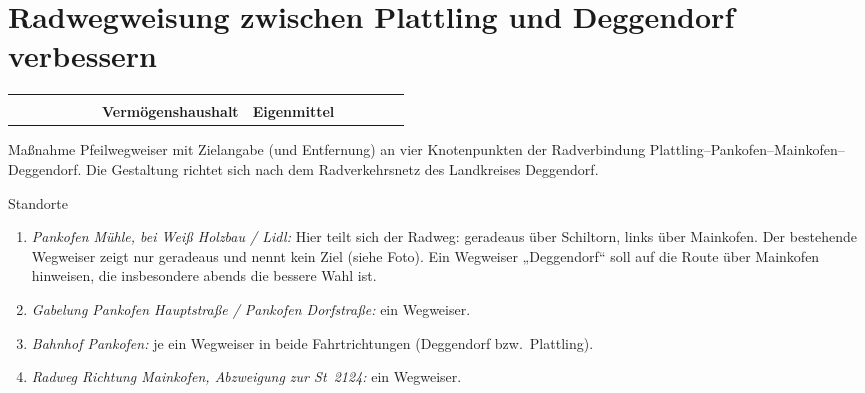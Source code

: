 \documentclass[11pt, a4paper]{article}
\makeatletter
\newcommand{\rubrik}[1]{{\small\bfseries\color{GruenAccent}\textls[80]{\MakeUppercase{#1}}}}
\newcommand{\kennzahl}[1]{\leavevmode{\scriptsize\color{Grau}\textls[60]{\MakeUppercase{#1}}}}
\newcommand{\massnahme}[3]{%
  \rubrik{#1}\par\nobreak\vspace{1mm}%
  \section{#2}\label{#3}}
\newcommand{\eckdaten}[3]{%
  \begin{tcolorbox}[enhanced, colback=GruenLight, frame hidden, arc=1.5mm,
      left=5mm, right=5mm, top=2.5mm, bottom=2.5mm, before skip=0pt, after skip=5mm]
    \begin{tabularx}{\linewidth}{@{}p{0.22\linewidth} p{0.24\linewidth} >{\raggedright\arraybackslash}X@{}}
      \kennzahl{Ansatz 2027} & \kennzahl{Haushalt} & \kennzahl{Förderung / Finanzierung} \\[0.5mm]
      \leavevmode{\Large\bfseries\color{GruenPrimary}#1} & \bfseries #2 & \bfseries #3
    \end{tabularx}
  \end{tcolorbox}}
\makeatother
\begin{document}
\clearpage


\massnahme{Radverkehr}{Radwegweisung zwischen Plattling und Deggendorf verbessern}{m:radweg}

\eckdaten{\qty{1500}{\EUR}}{Vermögenshaushalt}{Eigenmittel}

\begin{steckbrief}
  \item[Maßnahme] Pfeilwegweiser mit Zielangabe (und Entfernung) an vier Knotenpunkten der Radverbindung Plattling–Pankofen–Mainkofen–Deggendorf. Die Gestaltung richtet sich nach dem Radverkehrsnetz des Landkreises Deggendorf.
  \item[Standorte] \begin{enumerate}
      \item \textit{Pankofen Mühle, bei Weiß Holzbau / Lidl:} Hier teilt sich der Radweg: geradeaus über Schiltorn, links über Mainkofen. Der bestehende Wegweiser zeigt nur geradeaus und nennt kein Ziel (siehe Foto). Ein Wegweiser „Deggendorf“ soll auf die Route über Mainkofen hinweisen, die insbesondere abends die bessere Wahl ist.
      \item \textit{Gabelung Pankofen Hauptstraße / Pankofen Dorfstraße:} ein Wegweiser.
      \item \textit{Bahnhof Pankofen:} je ein Wegweiser in beide Fahrtrichtungen (Deggendorf bzw.\ Plattling).
      \item \textit{Radweg Richtung Mainkofen, Abzweigung zur St~2124:} ein Wegweiser.
    \end{enumerate}
\end{steckbrief}
\end{document}
